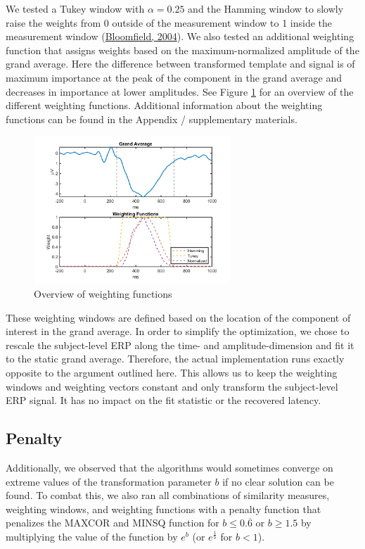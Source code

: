 \documentclass[
  man]{apa7}
\begin{document}
We tested a Tukey window with \(\alpha = 0.25\) and the Hamming window to slowly raise the weights from 0 outside of the measurement window to 1 inside the measurement window (\protect\hyperlink{ref-bloomfield2004fourier}{Bloomfield, 2004}). We also tested an additional weighting function that assigns weights based on the maximum-normalized amplitude of the grand average. Here the difference between transformed template and signal is of maximum importance at the peak of the component in the grand average and decreases in importance at lower amplitudes. See Figure \ref{fig:weighting-functions-overview-img} for an overview of the different weighting functions. Additional information about the weighting functions can be found in the Appendix / supplementary materials.



\begin{figure}
\includegraphics[width=2.92in]{../images/weighting_functions_overview} \caption{Overview of weighting functions}\label{fig:weighting-functions-overview-img}
\end{figure}

These weighting windows are defined based on the location of the component of interest in the grand average. In order to simplify the optimization, we chose to rescale the subject-level ERP along the time- and amplitude-dimension and fit it to the static grand average. Therefore, the actual implementation runs exactly opposite to the argument outlined here. This allows us to keep the weighting windows and weighting vectors constant and only transform the subject-level ERP signal. It has no impact on the fit statistic or the recovered latency.

\hypertarget{penalty}{%
\subsection{Penalty}\label{penalty}}

Additionally, we observed that the algorithms would sometimes converge on extreme values of the transformation parameter \(b\) if no clear solution can be found. To combat this, we also ran all combinations of similarity measures, weighting windows, and weighting functions with a penalty function that penalizes the MAXCOR and MINSQ function for \(b \le 0.\overline{6}\) or \(b \ge 1.5\) by multiplying the value of the function by \(e^b\) (or \(e^{\frac{1}{b}}\) for \(b < 1\)).
\end{document}

